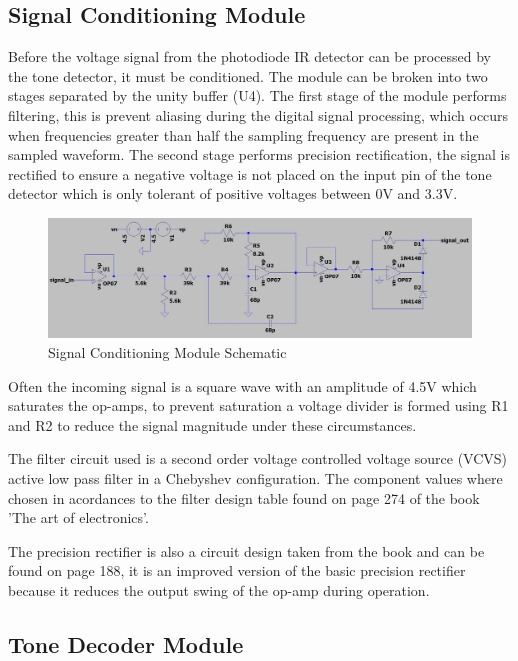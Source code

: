 \subsection{Signal Conditioning Module}

Before the voltage signal from the photodiode IR detector can be processed by the tone detector, it must be conditioned. The module can be broken into two stages separated by the unity buffer (U4). The first stage of the module performs filtering, this is prevent aliasing during the digital signal processing, which occurs when frequencies greater than half the sampling frequency are present in the sampled waveform. The second stage performs precision rectification, the signal is rectified to ensure a negative voltage is not placed on the input pin of the tone detector which is only tolerant of positive voltages between 0V and 3.3V.

\begin{figure}[H]
	\centering
	\includegraphics[width=\textwidth]{figures/design/filter_and_rectify}
	\caption{Signal Conditioning Module Schematic}
	\label{fig:schematic_filter_and_rectify}
\end{figure}

Often the incoming signal is a square wave with an amplitude of 4.5V which saturates the op-amps, to prevent saturation a voltage divider is formed using R1 and R2 to reduce the signal magnitude under these circumstances.

The filter circuit used is a second order voltage controlled voltage source (VCVS) active low pass filter in a Chebyshev configuration. The component values where chosen in acordances to the filter design table found on page 274 of the book 'The art of electronics'\cite{Horowitz1995}.

The precision rectifier is also a circuit design taken from the book and can be found on page 188, it is an improved version of the basic precision rectifier because it reduces the output swing of the op-amp during operation\cite{Horowitz1995}.

\subsection{Tone Decoder Module}

